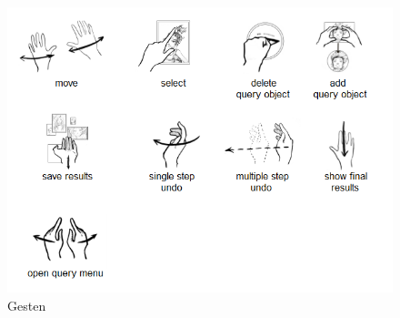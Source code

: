 \documentclass{sigchi-ext}
\begin{document}
\begin{figure}
  \centering
  \includegraphics[width=1.8\marginparwidth]{figures/gestures.png}
  \caption{Gesten}
  \label{fig:gestures}
\end{figure}

\balance{} 




\end{document}
